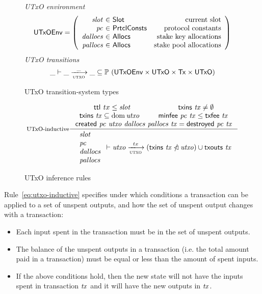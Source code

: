 \documentclass[11pt,a4paper]{article}
\newcommand{\Tx}{\type{Tx}}
\newcommand{\UTxO}{\type{UTxO}}
\newcommand{\PrtclConsts}{\type{PrtclConsts}}
\newcommand{\Slot}{\type{Slot}}
\newcommand{\Allocs}{\type{Allocs}}
\newcommand{\UTxOEnv}{\type{UTxOEnv}}
\newcommand{\txins}[1]{\fun{txins}~ \var{#1}}
\newcommand{\txouts}[1]{\fun{txouts}~ \var{#1}}
\newcommand{\ttl}[1]{\fun{ttl}~ \var{#1}}
\newcommand{\created}[5]{\fun{created}~ \var{#1}~ \var{#2}~ \var{#3}~ \var{#4}~ \var{#5}}
\newcommand{\destroyed}[2]{\fun{destroyed}~ \var{#1}~ \var{#2}}
\newcommand{\txfee}[1]{\fun{txfee}~ \var{#1}}
\newcommand{\minfee}[2]{\fun{minfee}~ \var{#1}~ \var{#2}}
\theoremstyle{definition}
\theoremstyle{definition}
\begin{document}
\begin{figure}
  \emph{UTxO environment}
  \begin{equation*}
    \UTxOEnv =
    \left(
      \begin{array}{r@{~\in~}lr}
        \var{slot} & \Slot & \text{current slot}\\
        \var{pc} & \PrtclConsts & \text{protocol constants}\\
        \var{dallocs} & \Allocs & \text{stake key allocations}\\
        \var{pallocs} & \Allocs & \text{stake pool allocations}\\
      \end{array}
    \right)
  \end{equation*}
  \emph{UTxO transitions}
  \begin{equation*}
    \_ \vdash
    \var{\_} \trans{utxo}{\_} \var{\_}
    \subseteq \powerset (\UTxOEnv \times \UTxO \times \Tx \times \UTxO)
  \end{equation*}
  \caption{UTxO transition-system types}
  \label{fig:ts-types:utxo}
\end{figure}

\begin{figure}
  \begin{equation}\label{eq:utxo-inductive}
    \inference[UTxO-inductive]
    { \ttl tx \leq \var{slot}
      & \txins{tx} \neq \emptyset
      \\
      \txins{tx} \subseteq \dom \var{utxo}
      & \minfee{pc}{tx} \leq \txfee{tx}
      \\
      \created{pc}{utxo}{dallocs}{pallocs}{tx} = \destroyed{pc}{tx}
    }
    {
      \begin{array}{l}
        \var{slot}\\
        \var{pc}\\
        \var{dallocs}\\
        \var{pallocs}\\
      \end{array}
      \vdash \var{utxo} \trans{utxo}{tx}
      (\txins{tx} \subtractdom \var{utxo}) \cup \txouts{tx}
    }
  \end{equation}
  \caption{UTxO inference rules}
  \label{fig:rules:utxo}
\end{figure}

Rule~\ref{eq:utxo-inductive} specifies under which conditions a transaction can
be applied to a set of unspent outputs, and how the set of unspent output
changes with a transaction:
\begin{itemize}
\item Each input spent in the transaction must be in the set of unspent
  outputs.
\item The balance of the unspent outputs in a transaction (i.e. the total
  amount paid in a transaction) must be equal or less than the amount of spent
  inputs.
\item If the above conditions hold, then the new state will not have the inputs
  spent in transaction $\mathit{tx}$ and it will have the new outputs in
  $\mathit{tx}$.
\end{itemize}
\end{document}
